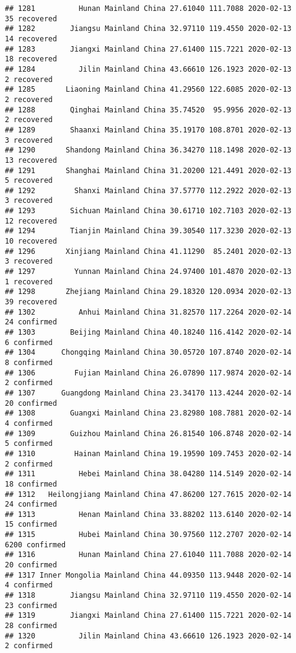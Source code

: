\documentclass[
]{article}
\begin{document}
\begin{verbatim}
## 1281          Hunan Mainland China 27.61040 111.7088 2020-02-13    35 recovered
## 1282        Jiangsu Mainland China 32.97110 119.4550 2020-02-13    14 recovered
## 1283        Jiangxi Mainland China 27.61400 115.7221 2020-02-13    18 recovered
## 1284          Jilin Mainland China 43.66610 126.1923 2020-02-13     2 recovered
## 1285       Liaoning Mainland China 41.29560 122.6085 2020-02-13     2 recovered
## 1288        Qinghai Mainland China 35.74520  95.9956 2020-02-13     2 recovered
## 1289        Shaanxi Mainland China 35.19170 108.8701 2020-02-13     3 recovered
## 1290       Shandong Mainland China 36.34270 118.1498 2020-02-13    13 recovered
## 1291       Shanghai Mainland China 31.20200 121.4491 2020-02-13     5 recovered
## 1292         Shanxi Mainland China 37.57770 112.2922 2020-02-13     3 recovered
## 1293        Sichuan Mainland China 30.61710 102.7103 2020-02-13    12 recovered
## 1294        Tianjin Mainland China 39.30540 117.3230 2020-02-13    10 recovered
## 1296       Xinjiang Mainland China 41.11290  85.2401 2020-02-13     3 recovered
## 1297         Yunnan Mainland China 24.97400 101.4870 2020-02-13     1 recovered
## 1298       Zhejiang Mainland China 29.18320 120.0934 2020-02-13    39 recovered
## 1302          Anhui Mainland China 31.82570 117.2264 2020-02-14    24 confirmed
## 1303        Beijing Mainland China 40.18240 116.4142 2020-02-14     6 confirmed
## 1304      Chongqing Mainland China 30.05720 107.8740 2020-02-14     8 confirmed
## 1306         Fujian Mainland China 26.07890 117.9874 2020-02-14     2 confirmed
## 1307      Guangdong Mainland China 23.34170 113.4244 2020-02-14    20 confirmed
## 1308        Guangxi Mainland China 23.82980 108.7881 2020-02-14     4 confirmed
## 1309        Guizhou Mainland China 26.81540 106.8748 2020-02-14     5 confirmed
## 1310         Hainan Mainland China 19.19590 109.7453 2020-02-14     2 confirmed
## 1311          Hebei Mainland China 38.04280 114.5149 2020-02-14    18 confirmed
## 1312   Heilongjiang Mainland China 47.86200 127.7615 2020-02-14    24 confirmed
## 1313          Henan Mainland China 33.88202 113.6140 2020-02-14    15 confirmed
## 1315          Hubei Mainland China 30.97560 112.2707 2020-02-14  6200 confirmed
## 1316          Hunan Mainland China 27.61040 111.7088 2020-02-14    20 confirmed
## 1317 Inner Mongolia Mainland China 44.09350 113.9448 2020-02-14     4 confirmed
## 1318        Jiangsu Mainland China 32.97110 119.4550 2020-02-14    23 confirmed
## 1319        Jiangxi Mainland China 27.61400 115.7221 2020-02-14    28 confirmed
## 1320          Jilin Mainland China 43.66610 126.1923 2020-02-14     2 confirmed

\end{verbatim}
\end{document}
